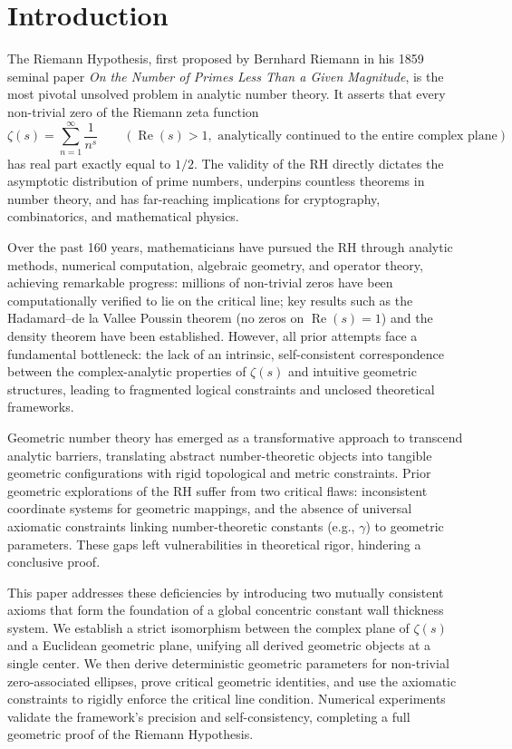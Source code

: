 \documentclass[12pt,a4paper]{article}
\theoremstyle{definition}
\begin{document}
\section{Introduction}
The Riemann Hypothesis, first proposed by Bernhard Riemann in his 1859 seminal paper \emph{On the Number of Primes Less Than a Given Magnitude}, is the most pivotal unsolved problem in analytic number theory. It asserts that every non-trivial zero of the Riemann zeta function
\[
\zeta(s) = \sum_{n=1}^\infty \frac{1}{n^s} \qquad (\operatorname{Re}(s)>1, \text{ analytically continued to the entire complex plane})
\]
has real part exactly equal to $1/2$. The validity of the RH directly dictates the asymptotic distribution of prime numbers, underpins countless theorems in number theory, and has far-reaching implications for cryptography, combinatorics, and mathematical physics.

Over the past 160 years, mathematicians have pursued the RH through analytic methods, numerical computation, algebraic geometry, and operator theory, achieving remarkable progress: millions of non-trivial zeros have been computationally verified to lie on the critical line; key results such as the Hadamard--de la Vallee Poussin theorem (no zeros on $\operatorname{Re}(s)=1$) and the density theorem have been established. However, all prior attempts face a fundamental bottleneck: the lack of an intrinsic, self-consistent correspondence between the complex-analytic properties of $\zeta(s)$ and intuitive geometric structures, leading to fragmented logical constraints and unclosed theoretical frameworks.

Geometric number theory has emerged as a transformative approach to transcend analytic barriers, translating abstract number-theoretic objects into tangible geometric configurations with rigid topological and metric constraints. Prior geometric explorations of the RH suffer from two critical flaws: inconsistent coordinate systems for geometric mappings, and the absence of universal axiomatic constraints linking number-theoretic constants (e.g., $\gamma$) to geometric parameters. These gaps left vulnerabilities in theoretical rigor, hindering a conclusive proof.

This paper addresses these deficiencies by introducing two mutually consistent axioms that form the foundation of a global concentric constant wall thickness system. We establish a strict isomorphism between the complex plane of $\zeta(s)$ and a Euclidean geometric plane, unifying all derived geometric objects at a single center. We then derive deterministic geometric parameters for non-trivial zero-associated ellipses, prove critical geometric identities, and use the axiomatic constraints to rigidly enforce the critical line condition. Numerical experiments validate the framework's precision and self-consistency, completing a full geometric proof of the Riemann Hypothesis.
\end{document}
